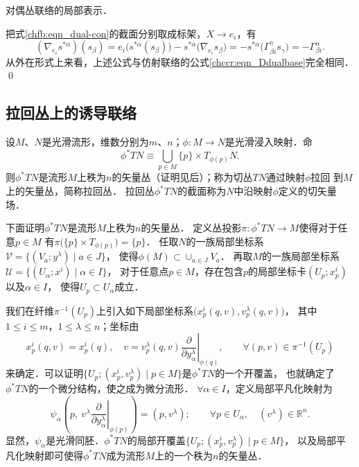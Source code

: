 \begin{example}
    对偶丛联络的局部表示．
\end{example}
把式\eqref{chfb:eqn_dual-con}的截面分别取成标架，$X\to {e_i}$，有
\begin{equation}\label{chfb:eqn_Dssg}
    (\nabla_{e_i} s^{*\alpha} )(s_\beta)= {e_i} \bigl(s^{*\alpha}(s_\beta)\bigr)
    -s^{*\alpha} \bigl(\nabla_{e_i} s_\beta\bigr)
    =-s^{*\alpha} \bigl( \Gamma_{\beta i}^\gamma s_\gamma \bigr)
    =-\Gamma_{\beta i}^\alpha .
\end{equation}
从外在形式上来看，上述公式与仿射联络的公式\eqref{chccr:eqn_Ddualbase}完全相同． 
\qed

 

\subsection{拉回丛上的诱导联络}\label{chfb:sec_pull-back-bundle}

设$M$、$N$是光滑流形，维数分别为$m$、$n$；$\phi:M\to N$是光滑浸入映射．命
\begin{equation}\label{chfb:eqn_pull-back-bundle}
    \phi^* TN \equiv \bigcup_{p \in M} \{p\}\times T_{\phi(p)} N .
\end{equation}
则$\phi^* TN$是流形$M$上秩为$n$的矢量丛（证明见后）；称为切丛$TN$通过映射$\phi$拉回
到$M$上的矢量丛，简称{\heiti 拉回丛}．
拉回丛$\phi^* TN$的截面称为$N$中{\heiti 沿映射$\phi$定义的切矢量场}．

下面证明$\phi^* TN$是流形$M$上秩为$n$的矢量丛．
定义丛投影$\pi : \phi^* TN \to M$使得对于任意$p\in M$
有$\pi\bigl(\{p\}\times T_{\phi(p)} \bigr)=\{p\} $．
任取$N$的一族局部坐标系$\mathcal{V}=\{(V_a; y^\lambda)\mid a \in J\}$，
使得$\phi(M)\subset \cup_{a\in J} V_a$．
再取$M$的一族局部坐标系$\mathcal{U}=\{(U_\alpha; x^i)\mid \alpha \in I\}$，
对于任意点$p\in M$，存在包含$p$的局部坐标卡$(U_p; x^i_p)$以及$\alpha\in I$，
使得$U_p \subset U_\alpha$成立．

我们在纤维$\pi^{-1}(U_p)$上引入如下局部坐标系$\bigl(x^i_p(q,v), v^\lambda_p(q,v)\bigr)$，
其中$1\leqslant i\leqslant m$，$ 1\leqslant \lambda \leqslant n$；坐标由
\begin{equation*}
    x^i_p(q,v)=x^i_p(q),\quad
    v=v^\lambda_p(q,v)\left.\frac{\partial}{\partial y^\lambda_\alpha}\right|_{\phi(q)} ,
    \qquad \forall (p,v)\in \pi^{-1}(U_p)
\end{equation*}
来确定．可以证明$\{U_p; (x^i_p, v^\lambda_p ) \mid p\in M\}$是$\phi^*TN$的一个开覆盖，
也就确定了$\phi^*TN$的一个微分结构，使之成为微分流形．
$\forall \alpha \in I$，定义局部平凡化映射为
\begin{equation*}
    \psi_\alpha \left(p,\  v^\lambda \left.\frac{\partial}{\partial y^\lambda_\alpha}\right|_{\phi(p)} \right)
    = (p, v^\lambda); \qquad
    \forall p\in U_\alpha, \quad (v^\lambda)\in \mathbb{R}^n .
\end{equation*}
显然，$\psi_\alpha$是光滑同胚．$\phi^*TN$的局部开覆盖$\{U_p; (x^i_p, v^\lambda_p ) \mid p\in M\}$，
以及局部平凡化映射即可使得$\phi^*TN$成为流形$M$上的一个秩为$n$的矢量丛．

